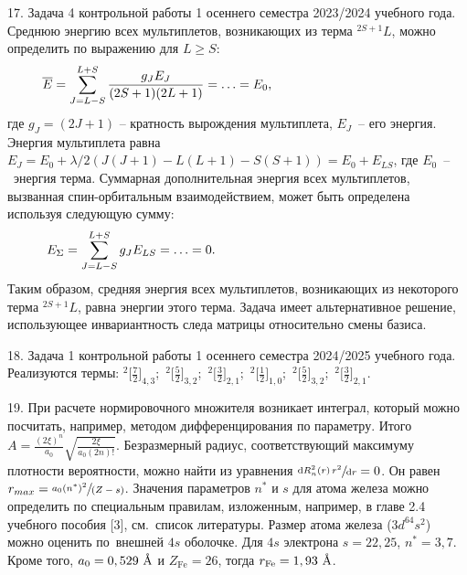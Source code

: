 17. Задача 4 контрольной работы 1 осеннего семестра 2023/2024 учебного года. Среднюю энергию всех мультиплетов, возникающих из терма $^{2S+1}L$, можно определить по выражению для $L\geq S$:
\begin{equation*}
\begin{aligned}
&\overline E=\sum_{J=L-S}^{L+S} \dfrac{g_JE_J}{(2S+1)(2L+1)} = \ldots = E_0,\hspace{41mm}
\end{aligned}
\end{equation*}
где $g_J=(2J+1)$ – кратность вырождения мультиплета, $E_J$~– его энергия. Энергия мультиплета равна $E_J=E_0+\lambda/2 ( J(J+1)-L(L+1)-S(S+1) )=E_0+E_{LS}$, где $E_0$~–~энергия терма. Суммарная дополнительная энергия всех мультиплетов, вызванная спин-орбитальным взаимодействием, может быть определена используя следующую сумму:
\begin{equation*}
\begin{aligned}
&E_{\Sigma}=\sum_{J=L-S}^{L+S} g_JE_{LS} = \ldots = 0.\hspace{55mm}
\end{aligned}
\end{equation*}
Таким образом, средняя энергия всех мультиплетов, возникающих из некоторого терма $^{2S+1}L$, равна энергии этого терма. Задача имеет альтернативное решение, использующее инвариантность следа матрицы относительно смены базиса.
\par
18. Задача 1 контрольной работы 1 осеннего семестра 2024/2025 учебного года. Реализуются термы: ${^2}\Big[ \frac{7}{2}\Big]_{4,3}$;\, ${^2}\Big[ \frac{5}{2}\Big]_{3,2}$;\, ${^2}\Big[ \frac{3}{2}\Big]_{2,1}$;\, ${^2}\Big[ \frac12\Big]_{1,0}$;\, ${^2}\Big[ \frac{5}{2}\Big]_{3,2}$;\, ${^2}\Big[ \frac{3}{2}\Big]_{2,1}.$\par
19. При расчете нормировочного множителя возникает интеграл, который можно посчитать, например, методом дифференцирования по параметру. Итого $A=\frac{(2\xi)^n}{a_0} \sqrt{\frac{2 \xi}{a_0 (2n)!}}$. Безразмерный радиус, соответствующий максимуму плотности вероятности, можно найти из уравнения $\sfrac{\text{d} R_n^2(r)\,r^2 }{\text{d}r} = 0$. Он равен $r_{max}=\sfrac{a_0(n^*)^2}{(Z-s)}$. Значения параметров $n^*$ и $s$ для атома железа можно определить по специальным правилам, изложенным, например, в главе 2.4 учебного пособия [3], см.~список литературы. Размер атома железа ($3d^64s^2$) можно оценить по~внешней $4s$ оболочке. Для $4s$ электрона $s = 22,25$, $n^*=3,7$. Кроме того, $a_0=0,529\,\,\text{\r{A}}$ и $Z_{\text{Fe}}=26$, тогда  $r_{\text{Fe}}=1,93\,\,\text{\r{A}}$.

